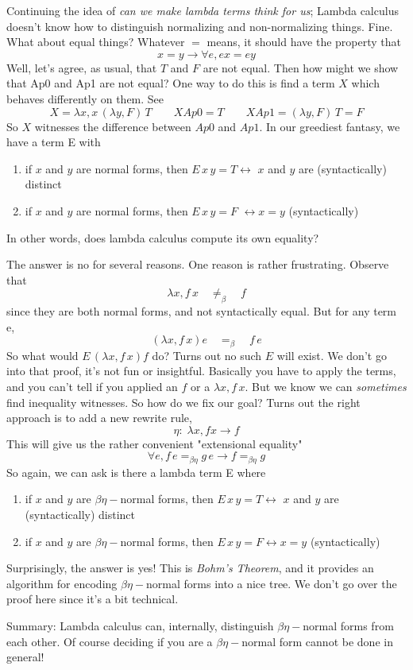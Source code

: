 \documentclass[12pt]{article}
\begin{document}
Continuing the idea of \textit{can we make lambda terms think for us};
Lambda calculus doesn't know how to distinguish normalizing and non-normalizing things. Fine.
What about equal things? 
Whatever $=$ means, it should have the property that
\[
  x = y \rightarrow \forall e, e x = e y
\]
Well, let's agree, as usual, that $T$ and $F$ are not equal.
Then how might we show that Ap0 and Ap1 are not equal? 
One way to do this is find a term $X$ which behaves differently on them.
See
\[
  X = \lambda x, x\, (\lambda y, F)\, T\quad\quad X Ap0 = T\quad\quad X Ap1 = (\lambda y, F)\, T = F
\]
So $X$ witnesses the difference between $Ap0$ and $Ap1$.
In our greediest fantasy, we have a term E with
\begin{enumerate}
    \item  if $x$ and $y$ are normal forms, then $E\, x\, y = T \leftrightarrow$ $x$ and $y$ are (syntactically) distinct
    \item  if $x$ and $y$ are normal forms, then $E\, x\, y = F$ $\leftrightarrow x = y$ (syntactically)
\end{enumerate}
In other words, does lambda calculus compute its own equality?

The answer is no for several reasons. 
One reason is rather frustrating.
Observe that
\[
  \lambda x, f\, x\quad \not=_\beta\quad  f
\]
since they are both normal forms, and not syntactically equal. 
But for any term e,
\[
  (\lambda x, f \, x) e \quad =_\beta \quad f\, e
\]
So what would $E\, (\lambda x, f\, x) f$ do?
Turns out no such $E$ will exist. 
We don't go into that proof, it's not fun or insightful. 
Basically you have to apply the terms, and you can't tell if you applied an $f$ or a $\lambda x, f\, x$.
But we know we can \textit{sometimes} find inequality witnesses.
So how do we fix our goal?
Turns out the right approach is to add a new rewrite rule,
\[
  \eta:\; \lambda x, f x \rightarrow f
\]
This will give us the rather convenient "extensional equality"
\[
  \forall e, f\, e =_{\beta\eta} g\, e \rightarrow f =_{\beta\eta} g
\]
So again, we can ask is there a lambda term E where
\begin{enumerate}
    \item  if $x$ and $y$ are $\beta\eta-$normal forms, then $E\, x\, y = T \leftrightarrow$ $x$ and $y$ are (syntactically) distinct
    \item  if $x$ and $y$ are $\beta\eta-$normal forms, then $E\, x\, y = F \leftrightarrow x = y$ (syntactically)
\end{enumerate}
Surprisingly, the answer is yes! This is \textit{Bohm's Theorem}, and it provides an algorithm for encoding $\beta\eta-$normal forms into a nice tree.
We don't go over the proof here since it's a bit technical.

Summary: Lambda calculus can, internally, distinguish $\beta\eta-$normal forms from each other.
Of course deciding if you are a $\beta\eta-$normal form cannot be done in general!
\end{document}
